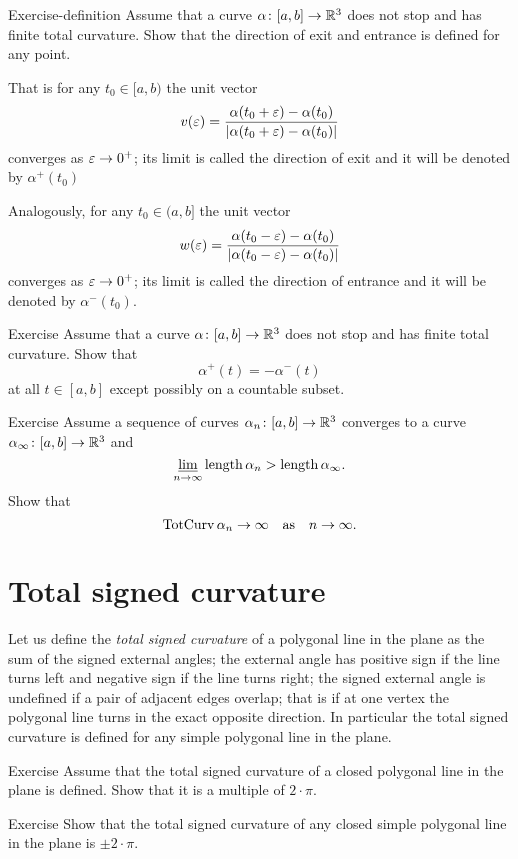 \begin{thm}{Exercise-definition} 
Assume that a curve $\alpha\colon[a,b]\to\mathbb{R}^3$ does not stop and has finite total curvature.
Show that the direction of exit and entrance is defined for any point.

That is for any $t_0\in [a,b)$ the unit vector  
\[v(\varepsilon)=\frac{\alpha(t_0+\varepsilon)-\alpha(t_0)}{|\alpha(t_0+\varepsilon)-\alpha(t_0)|}\] converges as $\varepsilon\to0^+$;
its limit is called the direction of exit and it will be denoted by $\alpha^+(t_0)$

Analogously, for any $t_0\in (a,b]$ the unit vector  
\[w(\varepsilon)=\frac{\alpha(t_0-\varepsilon)-\alpha(t_0)}{|\alpha(t_0-\varepsilon)-\alpha(t_0)|}\] 
converges as $\varepsilon\to0^+$;
its limit is called the direction of entrance and it will be denoted by $\alpha^-(t_0)$.
\end{thm}

\begin{thm}{Exercise} 
Assume that a curve $\alpha\colon[a,b]\to\mathbb{R}^3$ does not stop and has finite total curvature.
Show that 
\[\alpha^+(t)=-\alpha^-(t)\]
at all $t\in[a,b]$ except possibly on a countable subset.
\end{thm}

\begin{thm}{Exercise} 
Assume a sequence of curves $\alpha_n\colon[a,b]\to\mathbb{R}^3$ converges to a curve $\alpha_\infty\colon[a,b]\to\mathbb{R}^3$ and
\[ \varliminf_{n\to\infty}\mathop{\rm length}\nolimits\alpha_n>\mathop{\rm length}\nolimits\alpha_\infty.\]
Show that 
\[\mathop{\rm TotCurv}\nolimits\alpha_n\to\infty\quad\text{as}\quad n\to\infty.\]

\end{thm}


\section{Total signed curvature}

Let us define the \emph{total signed curvature} of a polygonal line in the plane as the sum of the signed external angles;
the external angle has positive sign if the line turns left and negative sign if the line turns right; the signed external angle is undefined if a pair of adjacent edges overlap;
that is if at one vertex the polygonal line turns in the exact opposite direction.
In particular the total signed curvature is defined for any simple polygonal line in the plane.

\begin{thm}{Exercise}\label{ex:2kpi}
Assume that the total signed curvature of a closed polygonal line in the plane is defined.
Show that it is a multiple of $2\cdot\pi$.
\end{thm}


\begin{thm}{Exercise}\label{ex:pm2pi}
Show that the total signed curvature of any closed simple polygonal line in the plane is $\pm2\cdot\pi$.
\end{thm}
